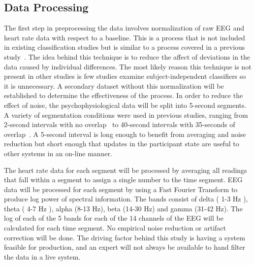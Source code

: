 \documentclass[11pt]{article}
\begin{document}
\subsection{Data Processing}
The first step in preprocessing the data involves normalization of raw EEG and heart rate data with respect to a baseline. This is a process that is not included in existing classification studies but is similar to a process covered in a previous study~\cite{Smith}. The idea behind this technique is to reduce the affect of deviations in the data caused by individual differences. The most likely reason this technique is not present in other studies is few studies examine subject-independent classifiers so it is unnecessary. A secondary dataset without this normalization will be established to determine the effectiveness of the process. In order to reduce the effect of noise, the psychophysiological data will be split into 5-second segments. A variety of segmentation conditions were used in previous studies, ranging from 2-second intervals with no overlap~\cite{Smith} to 40-second intervals with 35-seconds of overlap~\cite{Wang_Z}. A 5-second interval is long enough to benefit from averaging and noise reduction but short enough that updates in the participant state are useful to other systems in an on-line manner. 

The heart rate data for each segment will be processed by averaging all readings that fall within a segment to assign a single number to the time segment. EEG data will be processed for each segment by using a Fast Fourier Transform to produce log power of spectral information. The bands consist of delta ( 1-3 Hz ), theta ( 4-7 Hz ), alpha (8-13 Hz), beta (14-30 Hz) and gamma (31-42 Hz). The log of each of the 5 bands for each of the 14 channels of the EEG will be calculated for each time segment. No empirical noise reduction or artifact correction will be done. The driving factor behind this study is having a system feasible for production, and an expert will not always be available to hand filter the data in a live system.
\end{document}
